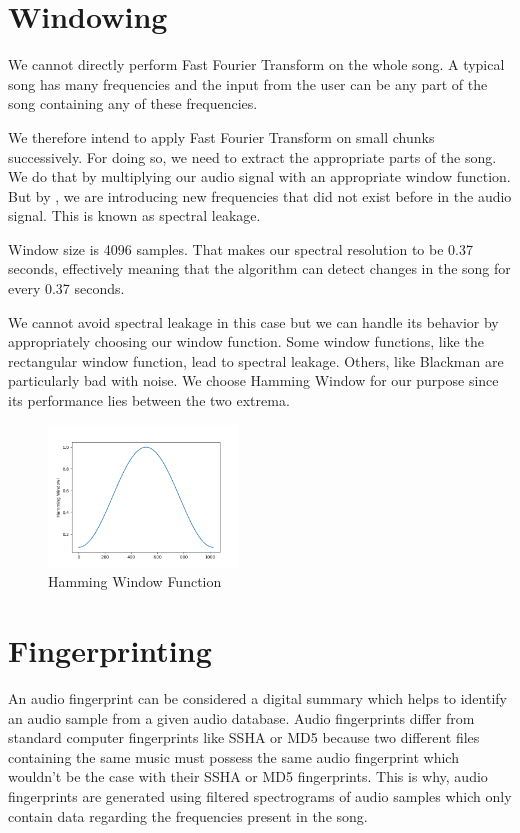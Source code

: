 \documentclass[12pt, a4paper]{IEEEtran}
\begin{document}
\section{Windowing}
We cannot directly perform Fast Fourier Transform on the whole song. A typical song has many frequencies and the input from the user can be any part of the song containing any of these frequencies. 
\par
We therefore intend to apply Fast Fourier Transform on small chunks successively. For doing so, we need to extract the appropriate parts of the song. 
We do that by multiplying our audio signal with an appropriate window function. But by , we are introducing new frequencies that did not exist before in the audio signal. This is known as spectral leakage. 
\par
Window size is 4096 samples. That makes our spectral resolution to be 0.37 seconds, effectively meaning that the algorithm can detect changes in the song for every 0.37 seconds.
\par
We cannot avoid spectral leakage in this case but we can handle its behavior by appropriately choosing our window function.
Some window functions, like the  rectangular window function, lead to spectral leakage. Others, like Blackman are particularly bad with noise.
We choose Hamming Window for our purpose since its performance lies between the two extrema.
\begin{figure}[h]
    \centering
    \includegraphics[width=0.45\textwidth]{hamming.png}
    \captionsetup{justification=centering}
    \caption{Hamming Window Function}
\end{figure}
\vspace*{16mm}
\section{Fingerprinting}
An audio fingerprint can be considered a digital summary which helps to identify an audio sample from a given audio database. Audio fingerprints differ from standard computer fingerprints like SSHA or MD5 because two different files containing the same music must possess the same audio fingerprint which wouldn't be the case with their SSHA or MD5 fingerprints. This is why, audio fingerprints are generated using filtered spectrograms of audio samples which only contain data regarding the frequencies present in the song.
\end{document}
